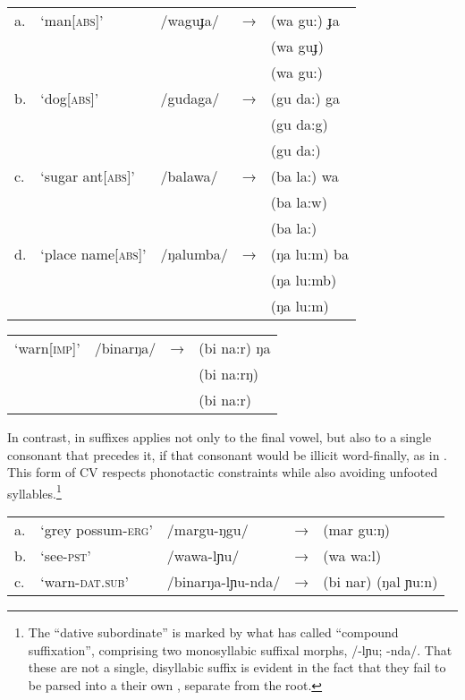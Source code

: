 \documentclass[output=paper,
modfonts
]{LSP/langsci}
\begin{document}
\ea \label{ex:round:7}
\begin{tabular}[t]{@{}lllll}
a.  & `man[\textsc{abs}]' & /waguɟa/  & → & (wa gu:) ɟa \\
&&&& \ljudge{*}(wa guɟ)\\
&&&& \ljudge{*}(wa gu:) \\

b. & `dog\textsc{[abs]}' & /gudaga/  & → & (gu da:) ga \\
&&&& \ljudge{*}(gu da:g)\\
&&&& \ljudge{*}(gu da:) \\

c. & `sugar ant[\textsc{abs}]'  & /balawa/  & → & (ba la:) wa \\
&&&& \ljudge{*}(ba la:w) \\
&&&& \ljudge{*}(ba la:) \\

d.  & `place name[\textsc{abs}]' & /ŋalumba/  & → & (ŋa lu:m) ba \\
&&&& \ljudge{*}(ŋa lu:mb)\\
&&&& \ljudge{*}(ŋa lu:m) \\
\end{tabular}

\ex \label{ex:round:8}
\begin{tabular}[t]{@{}llll}
`warn[\textsc{imp}]' & /binarŋa/  & → & (bi na:r) ŋa \\
&&& \ljudge{*}(bi na:rŋ)\\
&&& \ljudge{*}(bi na:r) \\
\end{tabular}
\z

\noindent In contrast,  in suffixes applies not only to the final vowel, but also to a single consonant that precedes it, if that consonant would be illicit word-finally, as in . This form of CV  respects phonotactic constraints while also avoiding unfooted syllables.\footnote{The ``dative subordinate'' is marked by what \citet[26]{round2013} has called ``compound suffixation'', comprising two monosyllabic suffixal morphs, /-lɲu; -nda/. That these are not a single, disyllabic suffix is evident in the fact that they fail to be parsed into a their own , separate from the root.}

\ea \label{ex:round:9} 
\begin{tabular}[t]{@{}lllll}
a. & `grey possum-\textsc{erg'} & /margu-ŋgu/ & → & (mar gu:ŋ) \\
b. & `see-\textsc{pst'} & /wawa-lɲu/  & → & (wa wa:l) \\
c. & `warn-\textsc{dat.sub'} & /binarŋa-lɲu-nda/  & →  & (bi nar) (ŋal ɲu:n) \\
\end{tabular}
\z
\end{document}
